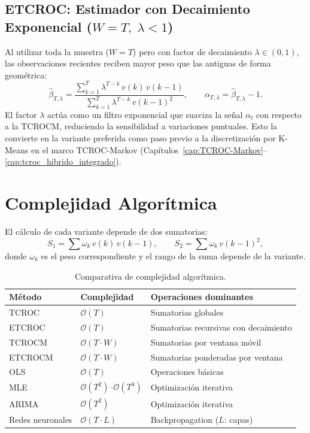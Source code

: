 \subsection{ETCROC: Estimador con Decaimiento Exponencial
(\texorpdfstring{$W=T,\;\lambda<1$}{W=T, lambda<1})}

Al utilizar toda la muestra ($W = T$) pero con factor de
decaimiento $\lambda \in (0,1)$, las observaciones recientes
reciben mayor peso que las antiguas de forma geométrica:
\begin{equation}
\hat{\beta}_{T,\lambda} = \frac{\sum_{k=1}^{T} \lambda^{T-k}\,
  v(k)\, v(k-1)}{\sum_{k=1}^{T} \lambda^{T-k}\, v(k-1)^2},
\qquad \alpha_{T,\lambda} = \hat{\beta}_{T,\lambda} - 1.
\label{eq:etcroc}
\end{equation}
El factor $\lambda$ actúa como un filtro exponencial que suaviza
la señal $\alpha_t$ con respecto a la TCROCM, reduciendo la
sensibilidad a variaciones puntuales.  Esto la convierte en la
variante preferida como paso previo a la discretización por
K-Means en el marco TCROC-Markov
(Capítulos~\ref{cap:TCROC-Markov}--\ref{cap:tcroc_hibrido_integrado}).


\section{Complejidad Algorítmica}
\label{sec:tcroc_complejidad}

El cálculo de cada variante depende de dos sumatorias:
\[
S_1 = \sum \omega_k\, v(k)\, v(k-1), \qquad S_2 = \sum \omega_k\, v(k-1)^2,
\]
donde \(\omega_k\) es el peso correspondiente y el rango de la suma depende de la variante.

\begin{table}[H]
\centering
\caption{Comparativa de complejidad algorítmica.}
\label{tab:tcroc_complejidad}
\begin{tabular}{@{}lll@{}}
\toprule
\textbf{Método} & \textbf{Complejidad} & \textbf{Operaciones dominantes} \\
\midrule
TCROC   & \(\mathcal{O}(T)\)            & Sumatorias globales \\
ETCROC  & \(\mathcal{O}(T)\)            & Sumatorias recursivas con decaimiento \\
TCROCM  & \(\mathcal{O}(T \cdot W)\)    & Sumatorias por ventana móvil \\
ETCROCM & \(\mathcal{O}(T \cdot W)\)    & Sumatorias ponderadas por ventana \\
\midrule
OLS     & \(\mathcal{O}(T)\)            & Operaciones básicas \\
MLE     & \(\mathcal{O}(T^2)\text{--}\mathcal{O}(T^3)\) & Optimización iterativa \\
ARIMA   & \(\mathcal{O}(T^2)\)          & Optimización iterativa \\
Redes neuronales & \(\mathcal{O}(T \cdot L)\) & Backpropagation (\(L\): capas) \\
\bottomrule
\end{tabular}
\end{table}

